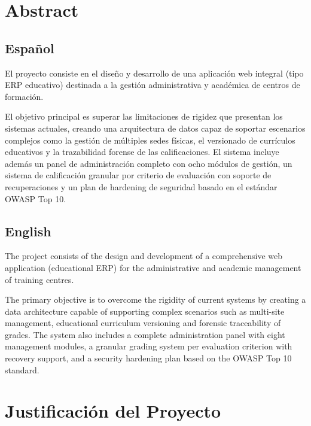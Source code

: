 \documentclass[12pt, a4paper]{report}
\begin{document}
\chapter{Abstract}

\section{Espa\~nol}

El proyecto consiste en el dise\~no y desarrollo de una aplicación web integral (tipo ERP educativo) destinada a la gestión administrativa y académica de centros de formación.

El objetivo principal es superar las limitaciones de rigidez que presentan los sistemas actuales, creando una arquitectura de datos capaz de soportar escenarios complejos como la gestión de múltiples sedes físicas, el versionado de currículos educativos y la trazabilidad forense de las calificaciones. El sistema incluye además un panel de administración completo con ocho módulos de gestión, un sistema de calificación granular por criterio de evaluación con soporte de recuperaciones y un plan de hardening de seguridad basado en el estándar OWASP Top 10.

\section{English}

The project consists of the design and development of a comprehensive web application
(educational ERP) for the administrative and academic management of training centres.

The primary objective is to overcome the rigidity of current systems by creating a data
architecture capable of supporting complex scenarios such as multi-site management,
educational curriculum versioning and forensic traceability of grades. The system also
includes a complete administration panel with eight management modules, a granular
grading system per evaluation criterion with recovery support, and a security hardening
plan based on the OWASP Top 10 standard.

\chapter{Justificación del Proyecto}
\end{document}
